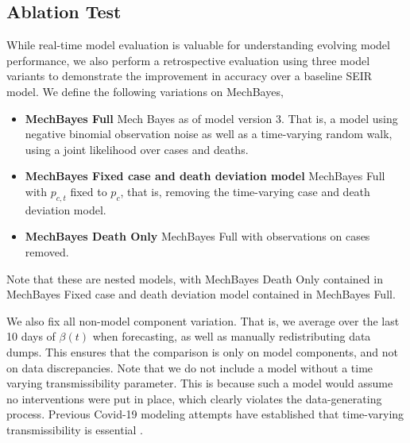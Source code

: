 \documentclass[11pt]{amsart}
\begin{document}
 
 \subsection{Ablation Test}
 
 While real-time model evaluation is valuable for understanding evolving model performance, we also perform a retrospective evaluation using three model variants to demonstrate the improvement in accuracy over a baseline SEIR model. We define the following variations on MechBayes,
 
 \begin{itemize}
 \item \textbf{MechBayes Full} Mech Bayes as of model version 3. That is, a model using negative binomial observation noise as well as a time-varying random walk, using a joint likelihood over cases and deaths.
 
 \item \textbf{MechBayes Fixed case and death deviation model} MechBayes Full with $p_{c,t}$ fixed to $p_c$, that is, removing the time-varying case and death deviation model.
 
 \item \textbf{MechBayes Death Only} MechBayes Full with observations on cases removed.
 \end{itemize}
 
 Note that these are nested models, with MechBayes Death Only contained in MechBayes Fixed case and death deviation model contained in MechBayes Full. 
 
  
 We also fix all non-model component variation. That is, we average over the last 10 days of $\beta(t)$ when forecasting, as well as manually redistributing data dumps. This ensures that the comparison is only on model components, and not on data discrepancies. Note that we do not include a model without a time varying transmissibility parameter. This is because such a model would assume no interventions were put in place, which clearly violates the data-generating process. Previous Covid-19 modeling attempts have established that time-varying transmissibility is essential \cite{pei2020differential} \cite{abbott2020estimating}\cite{flaxman2020estimating} \cite{smirnova2019forecasting}.
\end{document}
